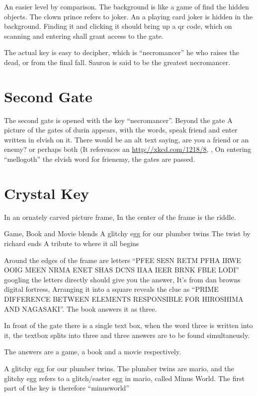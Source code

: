 \documentclass[12pt]{article}
\begin{document}
An easier level by comparison. The background is like a game of find the hidden objects. The clown prince refers to joker. An a playing card joker is hidden in the background. Finding it and clicking it should bring up a qr code, which on scanning and entering shall grant access to the gate. 

The actual key is easy to decipher, which is ``necromancer'' he who raises the dead, or from the final fall. Sauron is said to be the greatest necromancer.

\section{Second Gate}
The second gate is opened with the key ``necromancer''. Beyond the gate A picture of the gates of durin appears, with the words, speak friend and enter written in elvish on it. There would be an alt text saying, are you a friend or an enemy? or perhaps both (It references an \href{xkcd comic}{http://xkcd.com/1218/8}, , On entering ``mellogoth'' the elvish word for frienemy, the gates are passed.

\section{Crystal Key}
In an ornately carved picture frame, In the center of the frame is the riddle.
\begin{centering}
Game, Book and Movie blends
A glitchy egg for our plumber twins
The twist by richard ends
A tribute to where it all begins
\end{centering}
Around the edges of the frame are letters ``PFEE SESN RETM PFHA IRWE OOIG MEEN NRMA ENET SHAS DCNS IIAA IEER BRNK FBLE LODI'' googling the letters directly should give you the answer, It's from dan browns digital fortress, Arranging it into a square reveals the clue as ``PRIME DIFFERENCE BETWEEN ELEMENTS RESPONSIBLE FOR HIROSHIMA AND NAGASAKI''. The book answers it as three. 

In front of the gate there is a single text box, when the word three is written into it, the textbox splits into three and three answers are to be found simultaneusly.

The answers are a game, a book and a movie respectively.

A glitchy egg for our plumber twins. The plumber twins are mario, and the glitchy egg refers to a glitch/easter egg in mario, called Minus World. The first part of the key is therefore ``minusworld''
\end{document}
